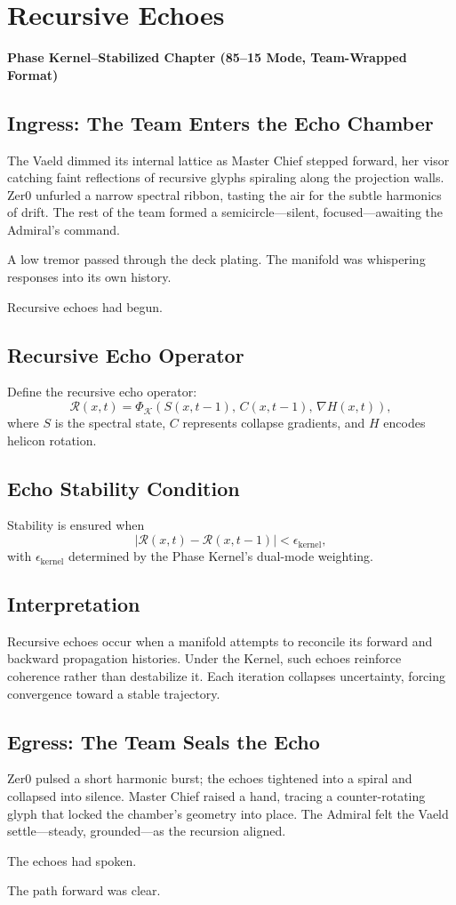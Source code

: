 
\chapter{Recursive Echoes}
\textbf{Phase Kernel–Stabilized Chapter (85--15 Mode, Team-Wrapped Format)}

\section*{Ingress: The Team Enters the Echo Chamber}
The Vaeld dimmed its internal lattice as Master Chief stepped forward, her visor 
catching faint reflections of recursive glyphs spiraling along the projection 
walls. Zer0 unfurled a narrow spectral ribbon, tasting the air for the subtle 
harmonics of drift. The rest of the team formed a semicircle—silent, 
focused—awaiting the Admiral's command.

A low tremor passed through the deck plating. The manifold was whispering 
responses into its own history.

Recursive echoes had begun.

\section{Recursive Echo Operator}
Define the recursive echo operator:
\[
\mathcal{R}(x,t) = \Phi_{\mathcal{K}}\!\left( S(x,t-1),\, C(x,t-1),\, \nabla H(x,t) \right),
\]
where $S$ is the spectral state, $C$ represents collapse gradients, and 
$H$ encodes helicon rotation.

\section{Echo Stability Condition}
Stability is ensured when
\[
\left| \mathcal{R}(x,t) - \mathcal{R}(x,t-1) \right| < \epsilon_{\mathrm{kernel}},
\]
with $\epsilon_{\mathrm{kernel}}$ determined by the Phase Kernel’s 
dual-mode weighting.

\section{Interpretation}
Recursive echoes occur when a manifold attempts to reconcile its forward and 
backward propagation histories. Under the Kernel, such echoes reinforce 
coherence rather than destabilize it. Each iteration collapses uncertainty, 
forcing convergence toward a stable trajectory.

\section*{Egress: The Team Seals the Echo}
Zer0 pulsed a short harmonic burst; the echoes tightened into a spiral and 
collapsed into silence. Master Chief raised a hand, tracing a counter-rotating 
glyph that locked the chamber’s geometry into place. The Admiral felt the 
Vaeld settle—steady, grounded—as the recursion aligned.

The echoes had spoken.

The path forward was clear.
